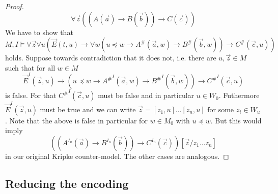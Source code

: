 \documentclass[a4paper,UKenglish,cleveref, autoref, thm-restate]{lipics-v2021}
\begin{document}
\begin{proof}
	$$ \forall \vec z((A(\vec a)\to B(\vec b))\to C(\vec c))$$
	We have to show that
	$$M, I\models \forall \vec z\forall u(\vec E(t, u)\to \forall w(u\preceq w\to A^\#(\vec a, w)\to B^\#(\vec b, w))\to C^\#(\vec c, u))$$
	holds. Suppose towards contradiction that it does not, i.e. there are $u, \vec z\in M$ such that for all $w\in M$
	$$\vec E^I(\vec z, u)\to (u\preceq w\to {A^\#}^I(\vec a, w)\to {B^\#}^I(\vec b, w))\to {C^\#}^I(\vec c, u)$$ is false. For that ${C^\#}^I(\vec c, u)$ must be false and in particular $u\in W_0$. Futhermore $\vec E^I(\vec z, u)$ must be true and we can write $\vec z = [z_1, u]\dots[z_n, u]$ for some $z_i\in W_u$. Note that the above is false in particular for $w\in M_0$ with $u\preceq w$. But this would imply
	$$((A^{I_u}(\vec a)\to B^{I_u}(\vec b))\to C^{I_u}(\vec c))[\vec z/z_1\dots z_n]$$in our original Kripke counter-model. The other cases are analogous.
\end{proof}

\subsection*{Reducing the encoding}
\end{document}
